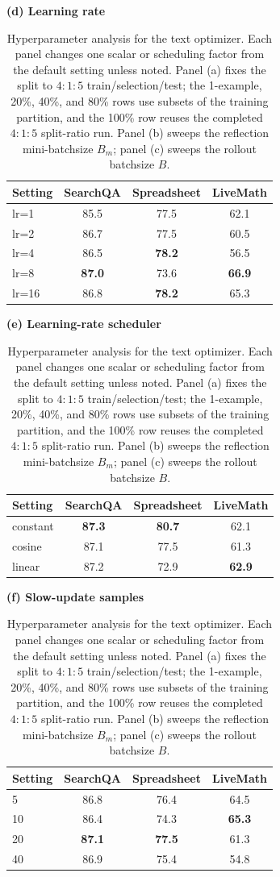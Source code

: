 \documentclass[
]{article}
\newcommand{\ablationbenchmarkheader}{\textbf{Setting} & \textbf{SearchQA} & \textbf{Spreadsheet} & \textbf{LiveMath} \\}
\begin{document}
\begin{table}[t]
{\begin{minipage}{1.12\textwidth}
%
\vspace{2pt}
%
\begin{minipage}[c]{0.33\textwidth}
\centering
\textbf{(d) Learning rate}\\[-1pt]
\begin{tabular}{@{}lccc@{}}
\toprule
\ablationbenchmarkheader
\midrule
lr=1 & 85.5 & 77.5 & 62.1 \\
lr=2 & 86.7 & 77.5 & 60.5 \\
lr=4 & 86.5 & \textbf{78.2} & 56.5 \\
lr=8 & \textbf{87.0} & 73.6 & \textbf{66.9} \\
lr=16 & 86.8 & \textbf{78.2} & 65.3 \\
\bottomrule
\end{tabular}
\end{minipage}
\hfill
\begin{minipage}[c]{0.33\textwidth}
\centering
\textbf{(e) Learning-rate scheduler}\\[-1pt]
\begin{tabular}{@{}lccc@{}}
\toprule
\ablationbenchmarkheader
\midrule
constant & \textbf{87.3} & \textbf{80.7} & 62.1 \\
cosine & 87.1 & 77.5 & 61.3 \\
linear & 87.2 & 72.9 & \textbf{62.9} \\
\bottomrule
\end{tabular}
\end{minipage}
\hfill
\begin{minipage}[c]{0.33\textwidth}
\centering
\textbf{(f) Slow-update samples}\\[-1pt]
\begin{tabular}{@{}lccc@{}}
\toprule
\ablationbenchmarkheader
\midrule
5 & 86.8 & 76.4 & 64.5 \\
10 & 86.4 & 74.3 & \textbf{65.3} \\
20 & \textbf{87.1} & \textbf{77.5} & 61.3 \\
40 & 86.9 & 75.4 & 54.8 \\
\bottomrule
\end{tabular}
\end{minipage}
\end{minipage}%
}
\caption{Hyperparameter analysis for the text optimizer. Each panel changes one scalar or scheduling factor from the default setting unless noted. Panel (a) fixes the split to $4{:}1{:}5$ train/selection/test; the 1-example, 20\%, 40\%, and 80\% rows use subsets of the training partition, and the 100\% row reuses the completed $4{:}1{:}5$ split-ratio run. Panel (b) sweeps the reflection mini-batchsize $B_m$; panel (c) sweeps the rollout batchsize $B$.}
\label{tab-ablation-sweeps}
\end{table}
\end{document}
